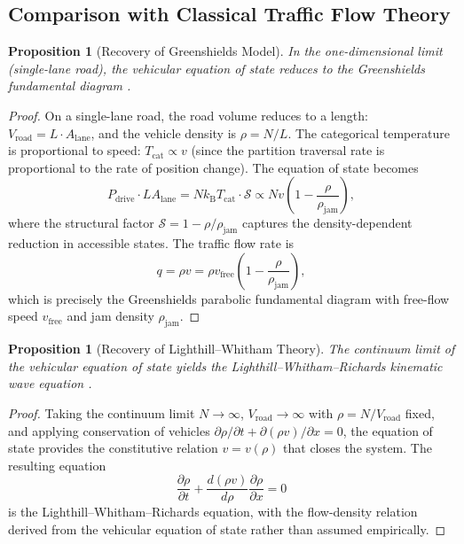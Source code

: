 \documentclass[twocolumn,10pt]{article}
\newtheorem{proposition}[theorem]{Proposition}
\newcommand{\kB}{k_{\mathrm{B}}}
\newcommand{\Tcat}{T_{\mathrm{cat}}}
\newcommand{\Pdrive}{P_{\mathrm{drive}}}
\newcommand{\Vroad}{V_{\mathrm{road}}}
\begin{document}
\subsection{Comparison with Classical Traffic Flow Theory}

\begin{proposition}[Recovery of Greenshields Model]\label{prop:greenshields}
In the one-dimensional limit (single-lane road), the vehicular equation of state reduces to the Greenshields fundamental diagram \cite{greenshields1935}.
\end{proposition}

\begin{proof}
On a single-lane road, the road volume reduces to a length: $\Vroad = L \cdot A_{\mathrm{lane}}$, and the vehicle density is $\rho = N / L$. The categorical temperature is proportional to speed: $\Tcat \propto v$ (since the partition traversal rate is proportional to the rate of position change). The equation of state becomes
\begin{equation}
\Pdrive \cdot L A_{\mathrm{lane}} = N \kB \Tcat \cdot \mathcal{S} \propto N v \left(1 - \frac{\rho}{\rho_{\mathrm{jam}}}\right),
\end{equation}
where the structural factor $\mathcal{S} = 1 - \rho/\rho_{\mathrm{jam}}$ captures the density-dependent reduction in accessible states. The traffic flow rate is
\begin{equation}
q = \rho v = \rho v_{\mathrm{free}}\left(1 - \frac{\rho}{\rho_{\mathrm{jam}}}\right),
\end{equation}
which is precisely the Greenshields parabolic fundamental diagram with free-flow speed $v_{\mathrm{free}}$ and jam density $\rho_{\mathrm{jam}}$.
\end{proof}

\begin{proposition}[Recovery of Lighthill--Whitham Theory]\label{prop:lw}
The continuum limit of the vehicular equation of state yields the Lighthill--Whitham--Richards kinematic wave equation \cite{lighthill1955}.
\end{proposition}

\begin{proof}
Taking the continuum limit $N \to \infty$, $\Vroad \to \infty$ with $\rho = N/\Vroad$ fixed, and applying conservation of vehicles $\partial \rho / \partial t + \partial(\rho v) / \partial x = 0$, the equation of state provides the constitutive relation $v = v(\rho)$ that closes the system. The resulting equation
\begin{equation}
\frac{\partial \rho}{\partial t} + \frac{d(\rho v)}{d\rho} \frac{\partial \rho}{\partial x} = 0
\end{equation}
is the Lighthill--Whitham--Richards equation, with the flow-density relation derived from the vehicular equation of state rather than assumed empirically.
\end{proof}
\end{document}
